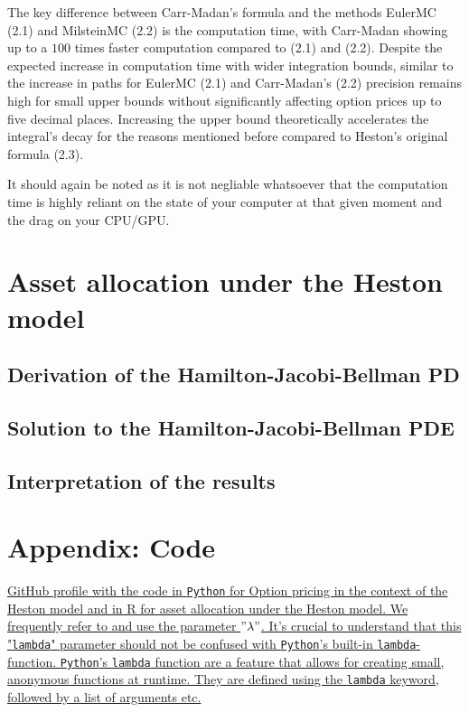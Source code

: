 \documentclass[12pt]{article}
\numberwithin{equation}{section}
\begin{document}
The key difference between Carr-Madan's formula and the methods EulerMC (2.1)
and MilsteinMC (2.2)  is the computation time, with Carr-Madan showing up to a
$100$ times faster computation compared to (2.1) and (2.2). Despite the expected
increase in computation time with wider integration bounds, similar to the
increase in paths for EulerMC (2.1) and Carr-Madan's (2.2) precision remains high for small
upper bounds without significantly affecting option prices up to five decimal
places. Increasing the upper bound theoretically accelerates the integral's
decay for the reasons mentioned before compared to Heston's original formula (2.3).

It should again be noted as it is not negliable whatsoever that the computation time is highly
reliant on the state of your computer at that given moment and the drag on your CPU/GPU.

\newpage
\section{Asset allocation under the Heston model}
\subsection{Derivation of the Hamilton-Jacobi-Bellman PD}
\subsection{Solution to the Hamilton-Jacobi-Bellman PDE}
\subsection{Interpretation of the results}


\newpage
\appendix
\section{Appendix: Code}\label{chap:code}
\href{https://github.com/YoussefRaad-mathecon/Handin-3}{GitHub profile
with the code in \texttt{Python} for Option pricing in the context of the Heston
model and in R for asset allocation under the Heston model. We frequently refer
to and use the parameter $"\lambda"$. It's crucial to understand that this
"\texttt{lambda}" parameter should not be confused with \texttt{Python}'s
built-in \texttt{lambda}-function. \texttt{Python}'s \texttt{lambda} function
are a feature that allows for creating small, anonymous functions at runtime.
They are defined using the \texttt{lambda} keyword, followed by a list of
arguments etc.}

\newpage



\end{document}
